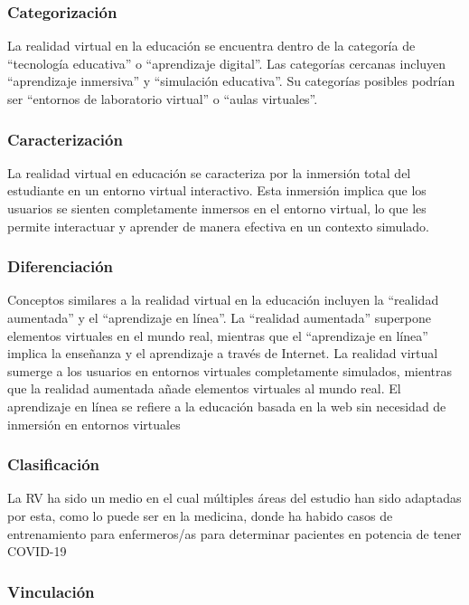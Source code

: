 \subsubsection{Categorización}

La realidad virtual en la educación se encuentra dentro de la categoría de “tecnología educativa” o “aprendizaje digital”. Las categorías cercanas incluyen “aprendizaje inmersiva” y “simulación educativa”. Su categorías posibles podrían ser “entornos de laboratorio virtual” o “aulas virtuales”.

\subsubsection{Caracterización}

La realidad virtual en educación se caracteriza por la inmersión total del estudiante en un entorno virtual interactivo. Esta inmersión implica que los usuarios se sienten completamente inmersos en el entorno virtual, lo que les permite interactuar y aprender de manera efectiva en un contexto simulado.

\subsubsection{Diferenciación}

Conceptos similares a la realidad virtual en la educación incluyen la “realidad aumentada” y el “aprendizaje en línea”. La “realidad aumentada” superpone elementos virtuales en el mundo real, mientras que el “aprendizaje en línea” implica la enseñanza y el aprendizaje a través de Internet. La realidad virtual sumerge a los usuarios en entornos virtuales completamente simulados, mientras que la realidad aumentada añade elementos virtuales al mundo real. El aprendizaje en línea se refiere a la educación basada en la web sin necesidad de inmersión en entornos virtuales \parencite{garcia2020}

\subsubsection{Clasificación}

La RV ha sido un medio en el cual múltiples áreas del estudio han sido adaptadas por esta, como lo puede ser en la medicina, donde ha habido casos de entrenamiento para enfermeros/as para determinar pacientes en potencia de tener COVID-19 \parencite{GUERRERO2022100002}

\subsubsection{Vinculación}

